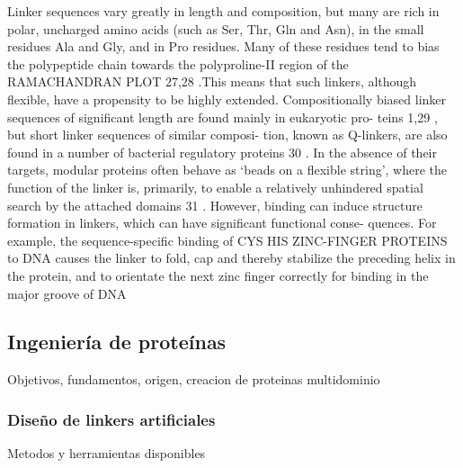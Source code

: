 Linker
sequences vary greatly in length and composition, but
many are rich in polar, uncharged amino acids (such as
Ser, Thr, Gln and Asn), in the small residues Ala and Gly,
and in Pro residues. Many of these residues tend to bias
the polypeptide chain towards the polyproline-II region
of the RAMACHANDRAN PLOT 27,28 .This means that such
linkers, although flexible, have a propensity to be highly
extended. Compositionally biased linker sequences of
significant length are found mainly in eukaryotic pro-
teins 1,29 , but short linker sequences of similar composi-
tion, known as Q-linkers, are also found in a number of
bacterial regulatory proteins 30 .
In the absence of their targets, modular proteins
often behave as ‘beads on a flexible string’, where the
function of the linker is, primarily, to enable a relatively
unhindered spatial search by the attached domains 31 .
However, binding can induce structure formation in
linkers, which can have significant functional conse-
quences. For example, the sequence-specific binding of
CYS HIS ZINC-FINGER PROTEINS to DNA causes the linker to
fold, cap and thereby stabilize the preceding helix in the
protein, and to orientate the next zinc finger correctly
for binding in the major groove of DNA



\subsection{Ingeniería de proteínas}
Objetivos, fundamentos, origen, creacion de proteinas multidominio



\subsubsection{Diseño de linkers artificiales}
Metodos y herramientas disponibles




